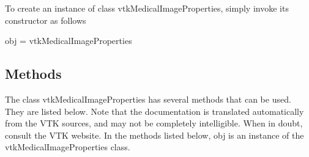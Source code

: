 To create an instance of class vtk\-Medical\-Image\-Properties, simply invoke its constructor as follows \begin{DoxyVerb}  obj = vtkMedicalImageProperties
\end{DoxyVerb}
 \hypertarget{vtkwidgets_vtkxyplotwidget_Methods}{}\subsection{Methods}\label{vtkwidgets_vtkxyplotwidget_Methods}
The class vtk\-Medical\-Image\-Properties has several methods that can be used. They are listed below. Note that the documentation is translated automatically from the V\-T\-K sources, and may not be completely intelligible. When in doubt, consult the V\-T\-K website. In the methods listed below, {\ttfamily obj} is an instance of the vtk\-Medical\-Image\-Properties class. 
